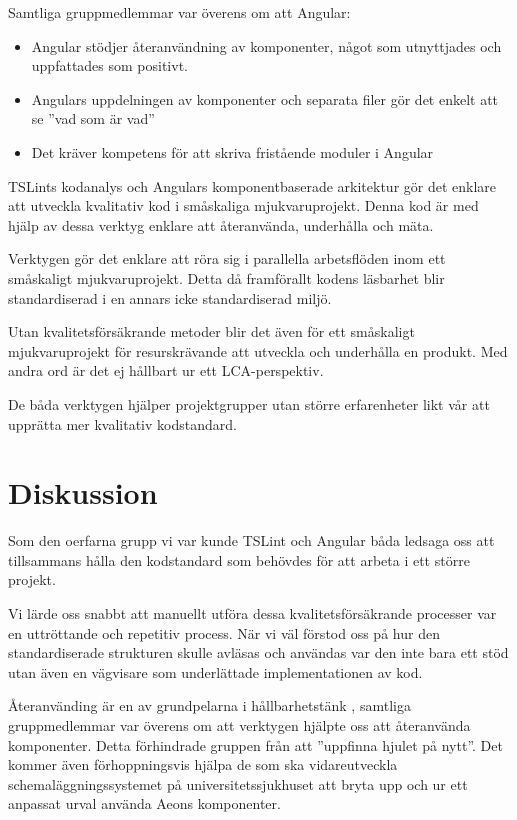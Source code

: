 Samtliga gruppmedlemmar var överens om att Angular:

\begin{itemize}
	\item Angular stödjer återanvändning av komponenter, något som utnyttjades och uppfattades som positivt.
	\item Angulars uppdelningen av komponenter och separata filer gör det enkelt att se ''vad som är vad''
	\item Det kräver kompetens för att skriva fristående moduler i Angular
\end{itemize}

TSLints kodanalys och Angulars komponentbaserade arkitektur gör det enklare att utveckla kvalitativ kod i småskaliga mjukvaruprojekt. Denna kod är med hjälp av dessa verktyg enklare att återanvända, underhålla och mäta.

Verktygen gör det enklare att röra sig i parallella arbetsflöden inom ett småskaligt mjukvaruprojekt. Detta då framförallt kodens läsbarhet blir standardiserad i en annars icke standardiserad miljö.

Utan kvalitetsförsäkrande metoder blir det även för ett småskaligt mjukvaruprojekt för resurskrävande att utveckla och underhålla en produkt. Med andra ord är det ej hållbart ur ett LCA-perspektiv.

De båda verktygen hjälper projektgrupper utan större erfarenheter likt vår att upprätta mer kvalitativ kodstandard.

\section{Diskussion}

Som den oerfarna  grupp vi var kunde TSLint och Angular båda ledsaga oss att tillsammans hålla den kodstandard som behövdes för att arbeta i ett större projekt.

Vi lärde oss snabbt att manuellt utföra dessa kvalitetsförsäkrande processer var en uttröttande och repetitiv process. När vi väl förstod oss på hur den standardiserade strukturen skulle avläsas och användas var den inte bara ett stöd utan även en vägvisare som underlättade implementationen av kod.

Återanvänding är en av grundpelarna i hållbarhetstänk \cite{sustainable}, samtliga gruppmedlemmar var överens om att verktygen hjälpte oss att återanvända komponenter. Detta förhindrade gruppen från att ''uppfinna hjulet på nytt''. Det kommer även förhoppningsvis hjälpa de som ska vidareutveckla schemaläggningssystemet på universitetssjukhuset att bryta upp och ur ett anpassat urval använda Aeons komponenter.



